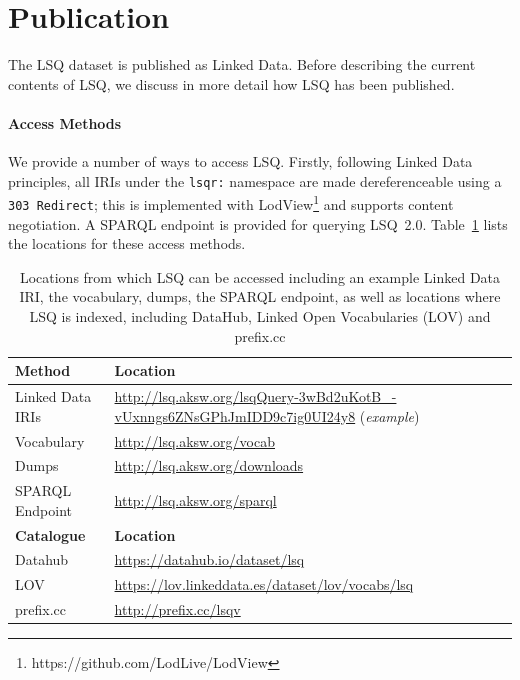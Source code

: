 \section{Publication}\label{sec:publish}

The LSQ dataset is published as Linked Data. Before describing the current contents of LSQ, we discuss in more detail how LSQ has been published.

\paragraph{Access Methods} We provide a number of ways to access LSQ. Firstly, following Linked Data principles, all IRIs under the \texttt{lsqr:} namespace are made dereferenceable using a \texttt{303 Redirect}; this is implemented with LodView\footnote{https://github.com/LodLive/LodView} and supports content negotiation. A SPARQL endpoint is provided for querying LSQ~2.0. Table~\ref{tab:access} lists the locations for these access methods.

\begin{table}
\centering
\setlength\columnsep{10pt}
\setlength{\tabcolsep}{3ex}
\caption{Locations from which LSQ can be accessed including an example Linked Data IRI, the vocabulary, dumps, the SPARQL endpoint, as well as locations where LSQ is indexed, including DataHub, Linked Open Vocabularies (LOV) and prefix.cc}
\label{tab:access}
\begin{tabular}{l@{~~~}l}
\toprule
\textbf{Method} & \textbf{Location}\\
\midrule
Linked Data IRIs & \url{http://lsq.aksw.org/lsqQuery-3wBd2uKotB_-vUxnngs6ZNsGPhJmIDD9c7ig0UI24y8} (\textit{example}) \\
Vocabulary & \url{http://lsq.aksw.org/vocab} \\
Dumps       	 & \url{http://lsq.aksw.org/downloads} \\
SPARQL Endpoint  & \url{http://lsq.aksw.org/sparql} \\
\midrule
\textbf{Catalogue} & \textbf{Location}\\
\midrule
Datahub		& \url{https://datahub.io/dataset/lsq} \\
LOV			& \url{https://lov.linkeddata.es/dataset/lov/vocabs/lsq} \\
prefix.cc	& \url{http://prefix.cc/lsqv} \\
\bottomrule
\end{tabular}
\end{table}

